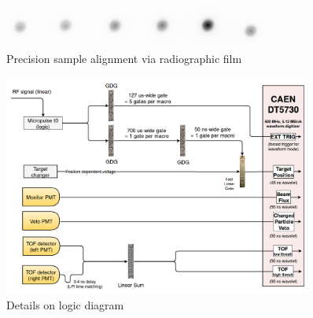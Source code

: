 \begin{figure}[h]
    \centering
    \includegraphics[width=0.8\textwidth]{figures/TargetChangerAlignment.png}
    \caption{Precision sample alignment via radiographic film}
    \label{SampleChangerAlignment}
\end{figure}

\begin{figure}
    \centering
    \includegraphics[width=0.9\textwidth]{figures/TCSLogicDiagram.png}
    \caption[Logic diagram for neutron \tot\ data acquisition]
    {Details on logic diagram}
    \label{TCSLogicDiagram}
\end{figure}

\afterpage{\clearpage}
